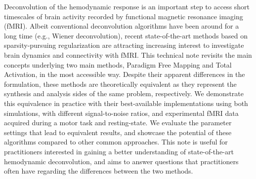 Deconvolution of the hemodynamic response is an important step to access short timescales of brain activity recorded by functional magnetic resonance imaging (fMRI). Albeit conventional deconvolution algorithms have been around for a long time (e.g., Wiener deconvolution), recent state-of-the-art methods based on sparsity-pursuing regularization are attracting increasing interest to investigate brain dynamics and connectivity with fMRI. This technical note revisits the main concepts underlying two main methods, Paradigm Free Mapping and Total Activation, in the most accessible way. Despite their apparent differences in the formulation, these methods are theoretically equivalent as they represent the synthesis and analysis sides of the same problem, respectively. We demonstrate this equivalence in practice with their best-available implementations using both simulations, with different signal-to-noise ratios, and experimental fMRI data acquired during a motor task and resting-state. We evaluate the parameter settings that lead to equivalent results, and showcase the potential of these algorithms compared to other common approaches. This note is useful for practitioners interested in gaining a better understanding of state-of-the-art hemodynamic deconvolution, and aims to answer questions that practitioners often have regarding the differences between the two methods.